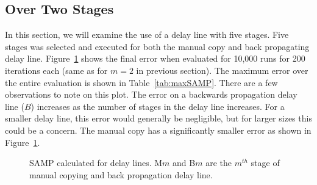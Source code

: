 \subsection{Over Two Stages}
\label{sec:dl_paper_over_two_stages}
In this section, we will examine the use of a delay line with five stages. Five stages was selected and executed for both the manual copy and back propagating delay line. Figure~\ref{fig:fiveStageAbsDiff} shows the final error when evaluated for 10,000 runs for 200 iterations each (same as for $m=2$ in previous section). The maximum error over the entire evaluation is shown in Table~\ref{tab:maxSAMP}. There are a few observations to note on this plot. The error on a backwards propagation delay line ($B$) increases as the number of stages in the delay line increases. For a smaller delay line, this error would generally be negligible, but for larger sizes this could be a concern. The manual copy has a significantly smaller error as shown in Figure~\ref{fig:fiveStageAbsDiff}.

\begin{figure}[ht]
	\centering
	\caption[Error for Both Delay Lines]{SAMP calculated for delay lines. M$m$ and B$m$ are the $m^{th}$ stage of manual copying and back propagation delay line.}
	\label{fig:fiveStageAbsDiff}
\end{figure}

